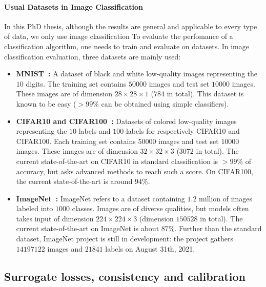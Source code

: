 \paragraph{Usual Datasets in Image Classification}
In this PhD thesis, although the results are general and applicable to every type of data, we only use image classification To evaluate the perfomance of a classification algorithm, one needs to train and evaluate on datasets. In image classification evaluation, three datasets are mainly used:
\begin{itemize}
    \item \textbf{MNIST~\citep{lecun1998mnist}:} A dataset of black and white low-quality images representing the $10$ digits. The training set contains $50000$ images and test set $10000$ images. These images are of dimension $28\times28\times 1$ ($784$ in total). This dataset is known to be easy ($>99\%$ can be obtained using simple classifiers). 
    \item \textbf{CIFAR10 and CIFAR100~\citep{krizhevsky2009learning}:} Datasets of colored low-quality images representing the $10$ labels and $100$ labels for respectively CIFAR10 and CIFAR100. Each training set contains $50000$ images and test set $10000$ images. These images are of dimension $32\times32\times 3$ ($3072$ in total). The current state-of-the-art on CIFAR10 in standard classification is $>99\%$ of accuracy, but asks advanced methods to reach such a score. On CIFAR100, the current state-of-the-art is around $94\%$. 
    \item \textbf{ImageNet~\citep{imagenet_cvpr09}:} ImageNet refers to a dataset containing $1.2$ million of images labeled into $1000$ classes. Images are of diverse qualities, but models often takes input of dimension $224\times224\times 3$ (dimension $150528$ in total). The current state-of-the-art on ImageNet is about $87\%$. Further than the standard dataset, ImageNet project is still in development: the project gathers $14197122$ images and $21841$ labels on August 31th, 2021.   


\end{itemize}

\subsection{Surrogate losses, consistency and calibration} 

